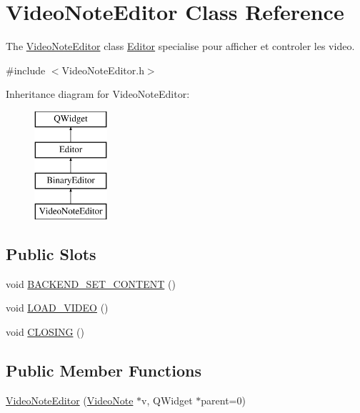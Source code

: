 \hypertarget{class_video_note_editor}{\section{Video\-Note\-Editor Class Reference}
\label{class_video_note_editor}
}


The \hyperlink{class_video_note_editor}{Video\-Note\-Editor} class \hyperlink{class_editor}{Editor} specialise pour afficher et controler les video.  




{\ttfamily \#include $<$Video\-Note\-Editor.\-h$>$}

Inheritance diagram for Video\-Note\-Editor\-:\begin{figure}[H]
\begin{center}
\leavevmode
\includegraphics[height=4.000000cm]{class_video_note_editor}
\end{center}
\end{figure}
\subsection*{Public Slots}
\begin{DoxyCompactItemize}
\item 
void \hyperlink{class_video_note_editor_adbf340dbf5ce233183931bd372bbcab5}{B\-A\-C\-K\-E\-N\-D\-\_\-\-S\-E\-T\-\_\-\-C\-O\-N\-T\-E\-N\-T} ()
\item 
void \hyperlink{class_video_note_editor_aa623a0f16c5b95c9edc8438c59408011}{L\-O\-A\-D\-\_\-\-V\-I\-D\-E\-O} ()
\item 
void \hyperlink{class_video_note_editor_a693b6558ef3ba861f2b7e099e5fbd023}{C\-L\-O\-S\-I\-N\-G} ()
\end{DoxyCompactItemize}
\subsection*{Public Member Functions}
\begin{DoxyCompactItemize}
\item 
\hyperlink{class_video_note_editor_acf6df787ad1b2a4c1b503dc332eac97e}{Video\-Note\-Editor} (\hyperlink{class_video_note}{Video\-Note} $\ast$v, Q\-Widget $\ast$parent=0)
\end{DoxyCompactItemize}
